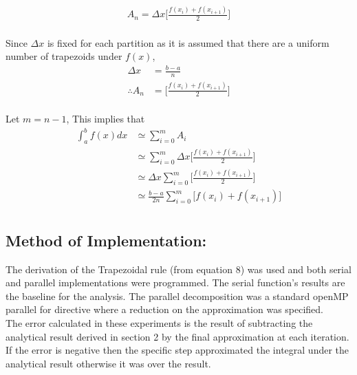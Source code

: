\documentclass[11pt]{article}
\begin{document}
\begin{page}
\begin{equation}
\begin{aligned}
    A_n = \Delta{x}\Bigg[\frac{f(x_i) + f(x_{i+1})}{2}\Bigg]
\end{aligned}
\end{equation}\\

\noindent Since $\Delta{x}$ is fixed for each partition as it is assumed that there are a uniform number of trapezoids under $f(x)$,\\

\begin{equation}
\begin{aligned}
    \Delta{x} &= \frac{b-a}{n}\\
    \therefore{A_n} &= \Bigg[\frac{f(x_i) + f(x_{i+1})}{2}\Bigg]
\end{aligned}
\end{equation}\\

\noindent Let $m = n-1$, This implies that\\

\begin{equation}
\begin{aligned}
    \int_a^b f(x) dx &\simeq \sum_{i=0}^{m}A_i\\
    &\simeq \sum_{i=0}^{m} \Delta{x} \Bigg[\frac{f(x_i) + f(x_{i+1})}{2}\Bigg]\\
    &\simeq \Delta{x} \sum_{i=0}^{m} \Bigg[\frac{f(x_i) + f(x_{i+1})}{2}\Bigg]\\
    &\simeq \frac{b-a}{2n} \sum_{i=0}^{m} \Bigg[f(x_i) + f(x_{i+1})\Bigg]\\
\end{aligned}
\end{equation}

\subsection{Method of Implementation:}
\noindent The derivation of the Trapezoidal rule (from equation 8) was used and both serial and parallel implementations were programmed. The serial function's results are the baseline for the analysis. The parallel decomposition was a standard openMP parallel for directive where a reduction on the approximation was specified.\\

\noindent The error calculated in these experiments is the result of subtracting the analytical result derived in section 2 by the final approximation at each iteration. If the error is negative then the specific step approximated the integral under the analytical result otherwise it was over the result.\\


\end{page}
\end{document}
